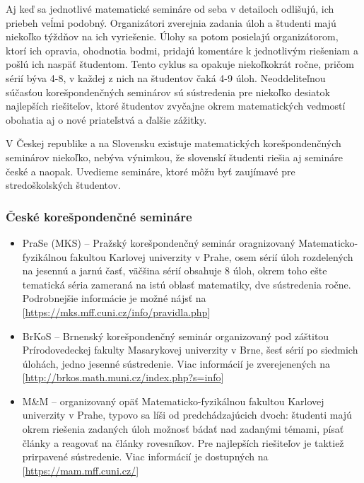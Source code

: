\documentclass[11pt,a4paper,oneside,final]{book}
\begin{document}
Aj keď sa jednotlivé matematické semináre od seba v detailoch odlišujú, ich priebeh veĺmi podobný. Organizátori zverejnia zadania úloh a študenti majú niekoľko týždňov na ich vyriešenie. Úlohy sa potom posielajú organizátorom, ktorí ich opravia, ohodnotia bodmi, pridajú komentáre k jednotlivým riešeniam a pošlú ich naspäť študentom. Tento cyklus sa opakuje niekoľkokrát ročne, pričom sérií býva 4-8, v každej z nich na študentov čaká 4-9 úloh. Neoddeliteľnou súčasťou korešpondenčných seminárov sú sústredenia pre niekoľko desiatok najlepších riešiteľov, ktoré študentov zvyčajne okrem matematických vedmostí obohatia aj o nové priateľstvá a ďalšie zážitky.

V Českej republike a na Slovensku existuje matematických korešpondenčných seminárov niekoľko, nebýva výnimkou, že slovenskí študenti riešia aj semináre české a naopak. Uvedieme semináre, ktoré môžu byť zaujímavé pre stredoškolských študentov.

\subsubsection{České korešpondenčné semináre}
\begin{itemize}
\item PraSe (MKS) -- Pražský korešpondenčný seminár oragnizovaný Matematicko-fyzikálnou fakultou  Karlovej univerzity v Prahe, osem sérií úloh rozdelených na jesennú a jarnú časť, väčšina sérií obsahuje 8 úloh, okrem toho ešte tematická séria zameraná na istú oblasť matematiky, dve sústredenia ročne. Podrobnejšie informácie je možné nájsť na [\url{https://mks.mff.cuni.cz/info/pravidla.php}]
\item BrKoS -- Brnenský korešpondenčný seminár organizovaný pod záštitou Prírodovedeckej fakulty Masarykovej univerzity v Brne, šesť sérií po siedmich úlohách, jedno jesenné sústredenie. Viac informácií je zverejenených na [\url{http://brkos.math.muni.cz/index.php?s=info}]
\item M\&M -- organizovaný opäť Matematicko-fyzikálnou fakultou Karlovej univerzity v Prahe, typovo sa líši od predchádzajúcich dvoch: študenti majú okrem riešenia zadaných úloh možnosť bádať nad zadanými témami, písať články a reagovať na články rovesníkov. Pre najlepších riešiteľov je taktiež prirpavené sústredenie. Viac informácií je dostupných na [\url{https://mam.mff.cuni.cz/}]
\end{itemize}
\end{document}
